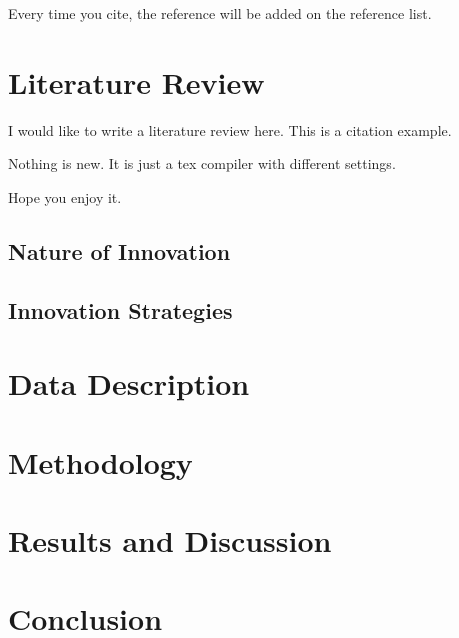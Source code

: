 \documentclass[12pt, a4paper]{article}
\begin{document}
Every time you cite, the reference will be added on the reference list.



\section{Literature Review}

I would like to write a literature review here. This is a citation example.

Nothing is new.  It is just a tex compiler with different settings. 

Hope you enjoy it. 


\subsection{Nature of Innovation}

\subsection{Innovation Strategies}

\section{Data Description}

\blindtext

\section{Methodology}


\section{Results and Discussion}

\section{Conclusion}






\newpage


\end{document}

